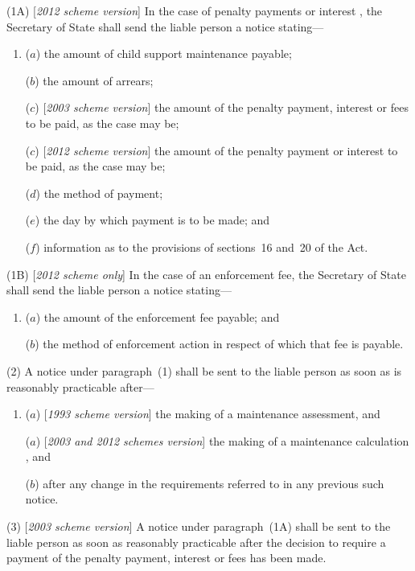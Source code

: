 \documentclass[12pt,a4paper]{article}
\begin{document}
(1A) [\emph{2012 scheme version}] In the case of penalty payments
or interest%
, the Secretary of State shall send the liable person a notice stating—
\begin{enumerate}\item[]
($a$) the amount of child support maintenance payable;

($b$) the amount of arrears;

($c$) [\emph{2003 scheme version}] the amount of the penalty payment, interest or fees to be paid, as the case may be;

($c$) [\emph{2012 scheme version}] the amount of the penalty payment
or interest  %
to be paid, as the case may be;

($d$) the method of payment;

($e$) the day by which payment is to be made; and

($f$) information as to the provisions of sections~16 and~20 of the Act.
\end{enumerate}

(1B) [\emph{2012 scheme only}] In the case of an enforcement fee, the Secretary of State shall send the liable person a notice stating—
\begin{enumerate}\item[]
($a$) the amount of the enforcement fee payable; and

($b$) the method of enforcement action in respect of which that fee is payable.
\end{enumerate}

(2) A notice under paragraph~(1) shall be sent to the liable person as soon as is reasonably practicable after—
\begin{enumerate}\item[]
($a$) [\emph{1993 scheme version}] the making of a maintenance assessment, and

($a$) [\emph{2003 and 2012 schemes version}] the making of a maintenance 
calculation%
, and

($b$) after any change in the requirements referred to in any previous such notice.
\end{enumerate}

(3) [\emph{2003 scheme version}] A notice under paragraph~(1A) shall be sent to the liable person as soon as reasonably practicable after the decision to require a payment of the penalty payment, interest or fees has been made.
\end{document}
